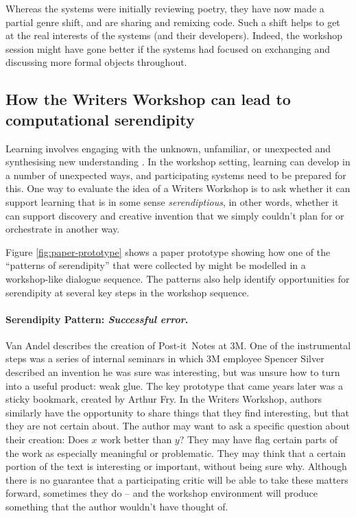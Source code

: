 Whereas the systems were initially reviewing poetry, they have now
made a partial genre shift, and are sharing and remixing code.  Such a
shift helps to get at the real interests of the systems (and their
developers).  Indeed, the workshop session might have gone better if
the systems had focused on exchanging and discussing more formal
objects throughout.


\subsection{How the Writers Workshop can lead to computational serendipity} \label{sec:how-serendipity}

Learning involves engaging with the unknown, unfamiliar, or unexpected
and synthesising new understanding \cite{deleuze1994difference}.  In
the workshop setting, learning can develop in a number of unexpected
ways, and participating systems need to be prepared for this.  One way
to evaluate the idea of a Writers Workshop is to ask whether it can
support learning that is in some sense \emph{serendiptious}, in other
words, whether it can support discovery and creative invention that we
simply couldn't plan for or orchestrate in another way.

Figure \ref{fig:paper-prototype} shows a paper prototype showing how
one of the ``patterns of serendipity'' that were collected by
 might be modelled in a workshop-like dialogue sequence.
The patterns also help identify opportunities for serendipity at
several key steps in the workshop sequence.

\paragraph{Serendipity Pattern: \emph{Successful error}.}  Van Andel describes the
creation of Post-it\texttrademark\ Notes at 3M.  One of the
instrumental steps was a series of internal seminars in which 3M
employee Spencer Silver described an invention he was sure was
interesting, but was unsure how to turn into a useful product: weak
glue.  The key prototype that came years later was a sticky bookmark,
created by Arthur Fry.  In the Writers Workshop, authors similarly
have the opportunity to share things that they find interesting, but
that they are not certain about.  The author may want to ask a
specific question about their creation: Does $x$ work better than $y$?
They may have flag certain parts of the work as especially meaningful
or problematic.  They may think that a certain portion of the text is
interesting or important, without being sure why.  Although there is
no guarantee that a participating critic will be able to take these
matters forward, sometimes they do -- and the workshop environment
will produce something that the author wouldn't have thought of.

